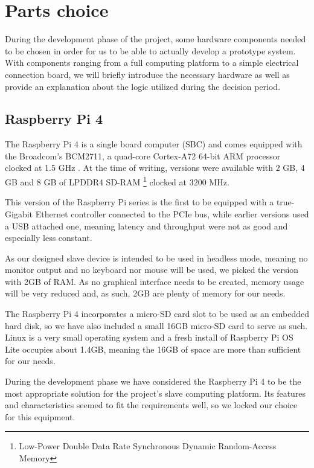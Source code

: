 \section{Parts choice} \label{sec:parts_choice}
During the development phase of the project, some hardware components needed to be chosen in order for us to be able to actually develop a prototype system.
With components ranging from a full computing platform to a simple electrical connection board, we will briefly introduce the necessary hardware as well as provide an explanation about the logic utilized during the decision period.


\subsection{Raspberry Pi 4} \label{subsec:rpi4}
The Raspberry Pi 4 is a single board computer (SBC) and comes equipped with the Broadcom's BCM2711, a quad-core Cortex-A72 64-bit ARM processor clocked at 1.5 GHz \cite{technology:rpi4-specs}.
At the time of writing, versions were available with 2 GB, 4 GB and 8 GB of LPDDR4 SD-RAM \footnote{Low-Power Double Data Rate Synchronous Dynamic Random-Access Memory} clocked at 3200 MHz.

This version of the Raspberry Pi series is the first to be equipped with a true-Gigabit Ethernet controller connected to the PCIe bus, while earlier versions used a USB attached one, meaning latency and throughput were not as good and especially less constant.

As our designed slave device is intended to be used in headless mode, meaning no monitor output and no keyboard nor mouse will be used, we picked the version with 2GB of RAM.
As no graphical interface needs to be created, memory usage will be very reduced and, as such, 2GB are plenty of memory for our needs.

The Raspberry Pi 4 incorporates a micro-SD card slot to be used as an embedded hard disk, so we have also included a small 16GB micro-SD card to serve as such.
Linux is a very small operating system and a fresh install of Raspberry Pi OS Lite occupies about 1.4GB, meaning the 16GB of space are more than sufficient for our needs.

During the development phase we have considered the Raspberry Pi 4 to be the most appropriate solution for the project's slave computing platform.
Its features and characteristics seemed to fit the requirements well, so we locked our choice for this equipment.

